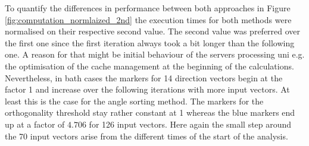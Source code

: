 To quantify the differences in performance between both approaches in Figure \ref{fig:computation_normlaized_2nd} the execution times for both methods were normalised on their respective second value. The second value was preferred over the first one since the first iteration always took a bit longer than the following one. A reason for that might be initial behaviour of the servers processing uni e.g. the optimisation of the cache management at the beginning of the calculations. Nevertheless, in bath cases the markers for 14 direction vectors begin at the factor 1 and increase over the following iterations with more input vectors. At least this is the case for the angle sorting method. The markers for the orthogonality threshold stay rather constant at 1 whereas the blue markers end up at a factor of $4.706$ for 126 input vectors. Here again the small step around the 70 input vectors arise from the different times of the start of the analysis.

